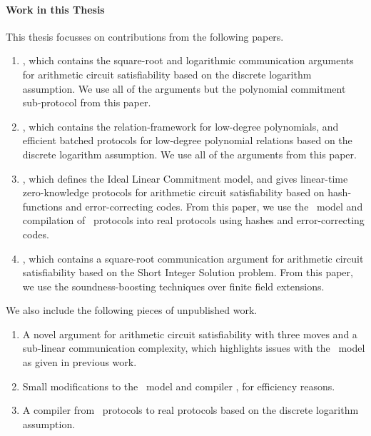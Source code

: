 \paragraph{Work in this Thesis} This thesis focusses on contributions from the following papers.
\begin{enumerate}
\item \cite{BootleCCGP16}, which contains the square-root and logarithmic communication arguments for arithmetic circuit satisfiability based on the discrete logarithm assumption. We use all of the arguments but the polynomial commitment sub-protocol from this paper.
\item \cite{BootleG18}, which contains the relation-framework for low-degree polynomials, and efficient batched protocols for low-degree polynomial relations based on the discrete logarithm assumption. We use all of the arguments from this paper.
\item \cite{BootleCGGHJ17}, which defines the Ideal Linear Commitment model, and gives linear-time zero-knowledge protocols for arithmetic circuit satisfiability based on hash-functions and error-correcting codes. From this paper, we use the \ILC\ model and compilation of \ILC\ protocols into real protocols using hashes and error-correcting codes.
\item \cite{BaumBCPGL18}, which contains a square-root communication argument for arithmetic circuit satisfiability based on the Short Integer Solution problem. From this paper, we use the soundness-boosting techniques over finite field extensions.
\end{enumerate}
We also include the following pieces of unpublished work.
\begin{enumerate}
\item A novel argument for arithmetic circuit satisfiability with three moves and a sub-linear communication complexity, which highlights issues with the \ILC\ model as given in previous work.
\item Small modifications to the \ILC\ model and compiler \cite{BootleCGGHJ17}, for efficiency reasons.
\item A compiler from \ILC\ protocols to real protocols based on the discrete logarithm assumption.
\end{enumerate}
